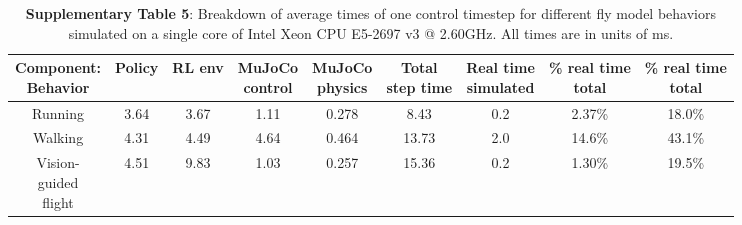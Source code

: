 \documentclass[sn-mathphys-num]{sn-jnl}%
\theoremstyle{thmstyleone}	%
\theoremstyle{thmstyletwo}	%
\theoremstyle{thmstylethree}	%
\begin{document}
\begin{appendices}
\begin{table}[htbp]
	\centering
	\small
	\caption{\textbf{Supplementary Table 5}: 
		Breakdown of average times of one control timestep for different fly model behaviors simulated on a single core of Intel Xeon CPU E5-2697 v3 @ 2.60GHz. 
		All times are in units of ms.}
	\begin{tabular}{ccccccccc}
		\toprule
		\makecell{Component:\\Behavior}         &        Policy  & RL env  & \makecell{MuJoCo\\control}  & \makecell{MuJoCo\\physics} & \makecell{Total\\step time} & \makecell{Real time\\simulated} & \makecell{\% real time\\total} & \makecell{\% real time\\total} \\
		\midrule
		Running     &   3.64      &    3.67 & 1.11 & 0.278 & 8.43 & 0.2 & 2.37\% & 18.0\% \\
		\midrule
		Walking     &   4.31      &    4.49 & 4.64 & 0.464 & 13.73 & 2.0 & 14.6\% & 43.1\% \\
		\makecell{Vision-\\guided\\flight}     &   4.51      &    9.83 & 1.03 & 0.257 & 15.36 & 0.2 & 1.30\% & 19.5\% \\
		\bottomrule
	\end{tabular}%
	\label{tab:s_5}%
\end{table}%





\end{appendices}
\end{document}
